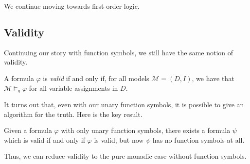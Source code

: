\documentclass[../notes.tex]{subfiles}
\begin{document}

We continue moving towards first-order logic.

\subsection{Validity}
Continuing our story with function symbols, we still have the same notion of validity.
\begin{defihelper}[Valid]
	A formula $\varphi$ is \textit{valid} if and only if, for all models $\mathcal M=(D,I)$, we have that $\mathcal M\models_g\varphi$ for all variable assignments in $D$.
\end{defihelper}
It turns out that, even with our unary function symbols, it is possible to give an algorithm for the truth. Here is the key result.
\begin{theorem}
	Given a formula $\varphi$ with only unary function symbols, there exists a formula $\psi$ which is valid if and only if $\varphi$ is valid, but now $\psi$ has no function symbols at all.
\end{theorem}
Thus, we can reduce validity to the pure monadic case without function symbols.
\end{document}
